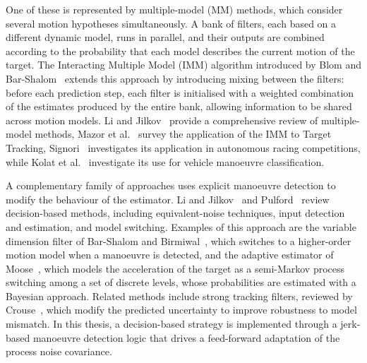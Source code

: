 One of these is represented by multiple-model (MM) methods, which consider several motion hypotheses simultaneously. A bank of filters, each based on a different dynamic model, runs in parallel, and their outputs are combined according to the probability that each model describes the current motion of the target. The Interacting Multiple Model (IMM) algorithm introduced by Blom and Bar-Shalom~\cite{blom1988} extends this approach by introducing mixing between the filters: before each prediction step, each filter is initialised with a weighted combination of the estimates produced by the entire bank, allowing information to be shared across motion models. Li and Jilkov~\cite{li2005multiple} provide a comprehensive review of multiple-model methods, Mazor et al.~\cite{mazor1998} survey the application of the IMM to Target Tracking, Signori~\cite{signori2024} investigates its application in autonomous racing competitions, while Kolat et al.~\cite{kolat2022} investigate its use for vehicle manoeuvre classification.

A complementary family of approaches uses explicit manoeuvre detection to modify the behaviour of the estimator. Li and Jilkov~\cite{li2002decision} and Pulford~\cite{pulford2015} review decision-based methods, including equivalent-noise techniques, input detection and estimation, and model switching. Examples of this approach are the variable dimension filter of Bar-Shalom and Birmiwal~\cite{barshalom1982}, which switches to a higher-order motion model when a manoeuvre is detected, and the adaptive estimator of Moose~\cite{moose1975}, which models the acceleration of the target as a semi-Markov process switching among a set of discrete levels, whose probabilities are estimated with a Bayesian approach. Related methods include strong tracking filters, reviewed by Crouse~\cite{crouse2019}, which modify the predicted uncertainty to improve robustness to model mismatch. In this thesis, a decision-based strategy is implemented through a jerk-based manoeuvre detection logic that drives a feed-forward adaptation of the process noise covariance.

